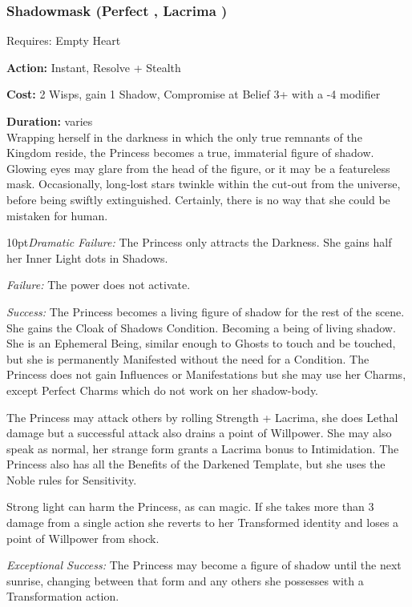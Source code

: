 \subsubsection*{Shadowmask (Perfect \textbullet\textbullet\textbullet\textbullet\textbullet, Lacrima \textbullet\textbullet\textbullet)}

\noindent Requires: Empty Heart

\noindent \textbf{Action:} Instant, Resolve + Stealth

\noindent \textbf{Cost:} 2 Wisps, gain 1 Shadow, Compromise at Belief 3+ with a -4 modifier

\noindent \textbf{Duration:} varies \\

\noindent Wrapping herself in the darkness in which the only true remnants of the Kingdom reside, the Princess becomes a true, immaterial figure of shadow. Glowing eyes may glare from the head of the figure, or it may be a featureless mask. Occasionally, long-lost stars twinkle within the cut-out from the universe, before being swiftly extinguished. Certainly, there is no way that she could be mistaken for human.

    \begin{myindentpar}{10pt}\emph{Dramatic Failure:} The Princess only attracts the Darkness. She gains half her Inner Light dots in Shadows.

    \emph{Failure:} The power does not activate.

    \emph{Success:} The Princess becomes a living figure of shadow for the rest of the scene. She gains the Cloak of Shadows Condition. Becoming a being of living shadow. She is an Ephemeral Being, similar enough to Ghosts to touch and be touched, but she is permanently Manifested without the need for a Condition. The Princess does not gain Influences or Manifestations but she may use her Charms, except Perfect Charms which do not work on her shadow-body.

	The Princess may attack others by rolling Strength + Lacrima, she does Lethal damage but a successful attack also drains a point of Willpower. She may also speak as normal, her strange form grants a Lacrima bonus to Intimidation. The Princess also has all the Benefits of the Darkened Template, but she uses the Noble rules for Sensitivity. 

	Strong light can harm the Princess, as can magic. If she takes more than 3 damage from a single action she reverts to her Transformed identity and loses a point of Willpower from shock.

    \emph{Exceptional Success:} The Princess may become a figure of shadow until the next sunrise, changing between that form and any others she possesses with a Transformation action.\end{myindentpar}

